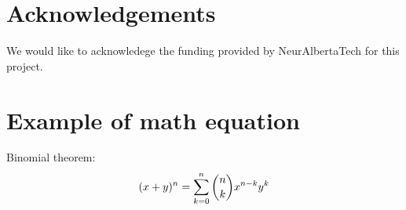 \documentclass[10pt]{cai}
\begin{document}
\section*{Acknowledgements}
We would like to acknowledege the funding provided by NeurAlbertaTech for this project.

\appendix

\section{Example of math equation }
Binomial theorem: \cite{hribarUsingDeepQLearning2019}
\begin{equation}
(x+y)^n=\sum_{\substack{k=0}}^{n}\dbinom{n}{k}x^{n-k}y^k
\end{equation}


\printbibliography[heading=subbibintoc]
\end{document}
